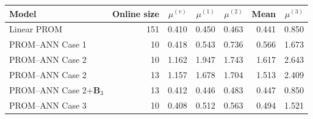 \begin{tabular}{lr|rrrr|r}
\toprule
Model & Online size & $\mu^{(v)}$ & $\mu^{(1)}$ & $\mu^{(2)}$ & Mean & $\mu^{(3)}$ \\
\midrule
Linear PROM & 151 & 0.410 & 0.450 & 0.463 & 0.441 & 0.850 \\
PROM--ANN Case 1 & 10 & 0.418 & 0.543 & 0.736 & 0.566 & 1.673 \\
PROM--ANN Case 2 & 10 & 1.162 & 1.947 & 1.743 & 1.617 & 2.643 \\
PROM--ANN Case 2 & 13 & 1.157 & 1.678 & 1.704 & 1.513 & 2.409 \\
PROM--ANN Case 2+$\mathbf B_3$ & 13 & 0.412 & 0.446 & 0.483 & 0.447 & 0.850 \\
PROM--ANN Case 3 & 10 & 0.408 & 0.512 & 0.563 & 0.494 & 1.521 \\
\bottomrule
\end{tabular}
